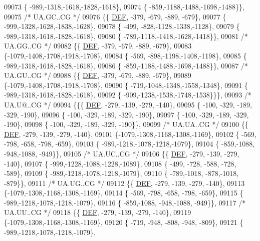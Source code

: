\begin{DoxyCode}
09073 \{ -989,-1318,-1618,-1828,-1618\},
09074 \{ -859,-1188,-1488,-1698,-1488\}\},
09075 \textcolor{comment}{/* UA.GC..CG */}
09076 \{\{  \mbox{\hyperlink{1_88_84__epars_8h_a397419fc12b37ed479c8abb9d444d843}{DEF}}, -379, -679, -889, -679\},
09077 \{ -999,-1328,-1628,-1838,-1628\},
09078 \{ -499, -828,-1128,-1338,-1128\},
09079 \{ -989,-1318,-1618,-1828,-1618\},
09080 \{ -789,-1118,-1418,-1628,-1418\}\},
09081 \textcolor{comment}{/* UA.GG..CG */}
09082 \{\{  \mbox{\hyperlink{1_88_84__epars_8h_a397419fc12b37ed479c8abb9d444d843}{DEF}}, -379, -679, -889, -679\},
09083 \{-1079,-1408,-1708,-1918,-1708\},
09084 \{ -569, -898,-1198,-1408,-1198\},
09085 \{ -989,-1318,-1618,-1828,-1618\},
09086 \{ -859,-1188,-1488,-1698,-1488\}\},
09087 \textcolor{comment}{/* UA.GU..CG */}
09088 \{\{  \mbox{\hyperlink{1_88_84__epars_8h_a397419fc12b37ed479c8abb9d444d843}{DEF}}, -379, -679, -889, -679\},
09089 \{-1079,-1408,-1708,-1918,-1708\},
09090 \{ -719,-1048,-1348,-1558,-1348\},
09091 \{ -989,-1318,-1618,-1828,-1618\},
09092 \{ -909,-1238,-1538,-1748,-1538\}\}\},
09093 \textcolor{comment}{/* UA.U@..CG */}
09094 \{\{\{  \mbox{\hyperlink{1_88_84__epars_8h_a397419fc12b37ed479c8abb9d444d843}{DEF}}, -279, -139, -279, -140\},
09095 \{ -100, -329, -189, -329, -190\},
09096 \{ -100, -329, -189, -329, -190\},
09097 \{ -100, -329, -189, -329, -190\},
09098 \{ -100, -329, -189, -329, -190\}\},
09099 \textcolor{comment}{/* UA.UA..CG */}
09100 \{\{  \mbox{\hyperlink{1_88_84__epars_8h_a397419fc12b37ed479c8abb9d444d843}{DEF}}, -279, -139, -279, -140\},
09101 \{-1079,-1308,-1168,-1308,-1169\},
09102 \{ -569, -798, -658, -798, -659\},
09103 \{ -989,-1218,-1078,-1218,-1079\},
09104 \{ -859,-1088, -948,-1088, -949\}\},
09105 \textcolor{comment}{/* UA.UC..CG */}
09106 \{\{  \mbox{\hyperlink{1_88_84__epars_8h_a397419fc12b37ed479c8abb9d444d843}{DEF}}, -279, -139, -279, -140\},
09107 \{ -999,-1228,-1088,-1228,-1089\},
09108 \{ -499, -728, -588, -728, -589\},
09109 \{ -989,-1218,-1078,-1218,-1079\},
09110 \{ -789,-1018, -878,-1018, -879\}\},
09111 \textcolor{comment}{/* UA.UG..CG */}
09112 \{\{  \mbox{\hyperlink{1_88_84__epars_8h_a397419fc12b37ed479c8abb9d444d843}{DEF}}, -279, -139, -279, -140\},
09113 \{-1079,-1308,-1168,-1308,-1169\},
09114 \{ -569, -798, -658, -798, -659\},
09115 \{ -989,-1218,-1078,-1218,-1079\},
09116 \{ -859,-1088, -948,-1088, -949\}\},
09117 \textcolor{comment}{/* UA.UU..CG */}
09118 \{\{  \mbox{\hyperlink{1_88_84__epars_8h_a397419fc12b37ed479c8abb9d444d843}{DEF}}, -279, -139, -279, -140\},
09119 \{-1079,-1308,-1168,-1308,-1169\},
09120 \{ -719, -948, -808, -948, -809\},
09121 \{ -989,-1218,-1078,-1218,-1079\},

\end{DoxyCode}
